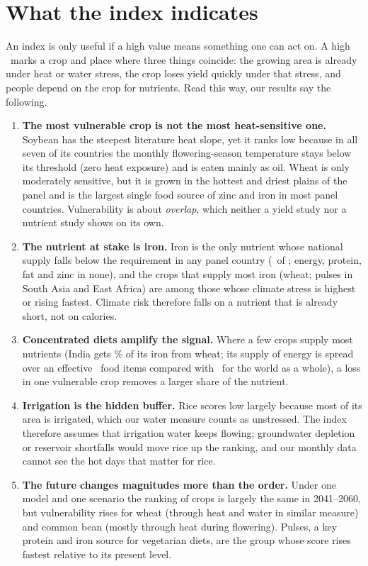\section{What the index indicates}\label{sec:meaning}

An index is only useful if a high value means something one can act on. A high \Fd\ marks a crop and place
where three things coincide: the growing area is already under heat or water stress, the crop loses yield
quickly under that stress, and people depend on the crop for nutrients. Read this way, our results say
the following.

\begin{enumerate}
\item \textbf{The most vulnerable crop is not the most heat-sensitive one.} Soybean has the steepest
literature heat slope, yet it ranks low because in all seven of its countries the monthly flowering-season
temperature stays below its threshold (zero heat exposure) and is eaten
mainly as oil. Wheat is only moderately sensitive, but it is grown in the hottest and driest plains of the
panel and is the largest single food source of zinc and iron in most panel countries. Vulnerability is about
\emph{overlap}, which neither a yield study nor a nutrient study shows on its own.
\item \textbf{The nutrient at stake is iron.} Iron is the only nutrient whose national supply falls below
the requirement in any panel country (\nIronShort\ of \nAdqCountries; energy, protein, fat and zinc in none), and the crops that supply most iron (wheat; pulses in South Asia and East Africa) are among
those whose climate stress is highest or rising fastest. Climate risk therefore falls on a nutrient that is
already short, not on calories.
\item \textbf{Concentrated diets amplify the signal.} Where a few crops supply most nutrients (India gets
\divIndIronTopShare\% of its iron from wheat; its supply of energy is spread over an effective
\divIndKcal\ food items compared with \divWorldKcal\ for the world as a whole), a loss in one vulnerable
crop removes a larger share of the nutrient.
\item \textbf{Irrigation is the hidden buffer.} Rice scores low largely because most of its area is
irrigated, which our water measure counts as unstressed. The index therefore assumes that irrigation water
keeps flowing; groundwater depletion or reservoir shortfalls would move rice up the ranking, and our
monthly data cannot see the hot days that matter for rice.
\item \textbf{The future changes magnitudes more than the order.} Under one model and one scenario the
ranking of crops is largely the same in 2041--2060, but vulnerability rises for wheat (through heat and
water in similar measure) and common bean (mostly through heat during flowering). Pulses, a key protein and iron source for vegetarian diets, are the
group whose score rises fastest relative to its present level.
\end{enumerate}

